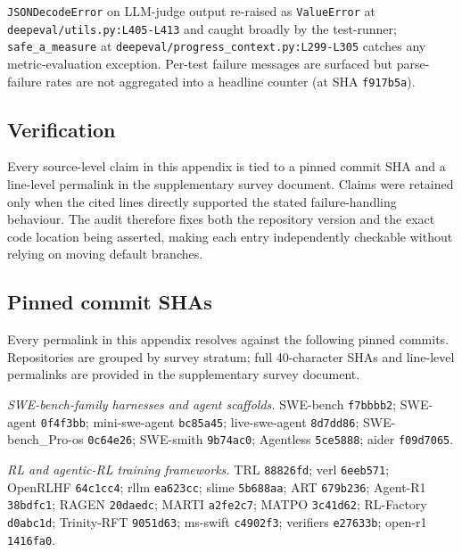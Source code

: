 \documentclass{article}
\begin{document}
\begin{description}[leftmargin=0pt,itemindent=0pt,labelindent=0pt,labelsep=0.4em,itemsep=2pt,topsep=2pt,parsep=0pt,font=\normalfont\bfseries]
\item[deepeval:] \texttt{JSONDecodeError} on LLM-judge output
re-raised as \texttt{ValueError} at
\texttt{deepeval/utils.py:L405-L413} and caught broadly by the
test-runner; \texttt{safe\_a\_measure} at
\texttt{deepeval/progress\_context.py:L299-L305} catches any
metric-evaluation exception. Per-test failure messages are
surfaced but parse-failure rates are not aggregated into a
headline counter (at SHA \texttt{f917b5a}).
\end{description}

\subsection{Verification}
\label{app:survey:verification}

Every source-level claim in this appendix is tied to a pinned
commit SHA and a line-level permalink in the supplementary
survey document. Claims were retained only when the cited lines
directly supported the stated failure-handling behaviour. The
audit therefore fixes both the repository version and the exact
code location being asserted, making each entry independently
checkable without relying on moving default branches.

\subsection{Pinned commit SHAs}
\label{app:survey:shas}

Every permalink in this appendix resolves against the
following pinned commits. Repositories are grouped by survey
stratum; full 40-character SHAs and line-level permalinks are
provided in the supplementary survey document.

\emph{SWE-bench-family harnesses and agent scaffolds.}
SWE-bench \texttt{f7bbbb2}; SWE-agent \texttt{0f4f3bb};
mini-swe-agent \texttt{bc85a45}; live-swe-agent
\texttt{8d7dd86}; SWE-bench\_Pro-os \texttt{0c64e26};
SWE-smith \texttt{9b74ac0}; Agentless \texttt{5ce5888};
aider \texttt{f09d7065}.

\emph{RL and agentic-RL training frameworks.}
TRL \texttt{88826fd}; verl \texttt{6eeb571}; OpenRLHF
\texttt{64c1cc4}; rllm \texttt{ea623cc}; slime
\texttt{5b688aa}; ART \texttt{679b236}; Agent-R1
\texttt{38bdfc1}; RAGEN \texttt{20daedc}; MARTI
\texttt{a2fe2c7}; MATPO \texttt{3c41d62}; RL-Factory
\texttt{d0abc1d}; Trinity-RFT \texttt{9051d63}; ms-swift
\texttt{c4902f3}; verifiers \texttt{e27633b}; open-r1
\texttt{1416fa0}.
\end{document}
